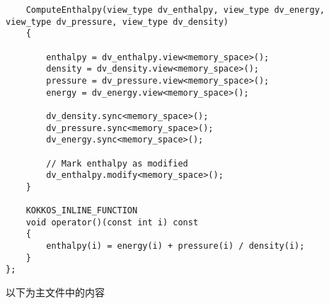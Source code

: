 \begin{lstlisting}
    ComputeEnthalpy(view_type dv_enthalpy, view_type dv_energy, view_type dv_pressure, view_type dv_density)
    {

        enthalpy = dv_enthalpy.view<memory_space>();
        density = dv_density.view<memory_space>();
        pressure = dv_pressure.view<memory_space>();
        energy = dv_energy.view<memory_space>();

        dv_density.sync<memory_space>();
        dv_pressure.sync<memory_space>();
        dv_energy.sync<memory_space>();

        // Mark enthalpy as modified
        dv_enthalpy.modify<memory_space>();
    }

    KOKKOS_INLINE_FUNCTION
    void operator()(const int i) const
    {
        enthalpy(i) = energy(i) + pressure(i) / density(i);
    }
};
\end{lstlisting}
以下为主文件中的内容
